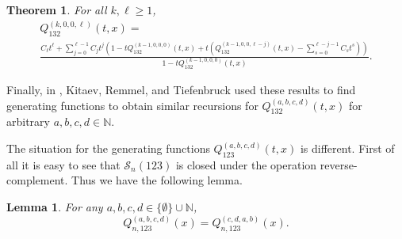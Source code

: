 \documentclass[
final,nomarks
]{dmtcs-episciences}
\newtheorem{theorem}{Theorem}
\newtheorem{lemma}{Lemma}
\newcommand{\Sn}[1]{\mathcal{S}_{#1}}
\begin{document}
\begin{theorem} \label{thm:k00l}
	For all \begin{math}k, \ell \geq 1\end{math}, 
	\begin{multline}\label{Qk00lgf-}
	Q_{132}^{(k,0,0,\ell)}(t,x) = \\
	\frac{C_\ell t^\ell + \sum_{j=0}^{\ell -1} C_j t^j (1 -tQ_{132}^{(k-1,0,0,0)}(t,x)
		+t(Q_{132}^{(k-1,0,0,\ell-j)}(t,x)-\sum_{s=0}^{\ell -j -1}C_s t^s))}{1-tQ_{132}^{(k-1,0,0,0)}(t,x)}.
	\end{multline}
\end{theorem}

Finally, in \cite{KRT3}, Kitaev, Remmel, and Tiefenbruck used these results to 
find generating functions to obtain similar recursions for \begin{math}Q_{132}^{(a,b,c,d)}(t,x)\end{math} 
for arbitrary \begin{math}a,b,c,d \in \mathbb{N}\end{math}. 


The situation for the generating functions \begin{math}Q_{123}^{(a,b,c,d)}(t,x)\end{math} is different. First of all it 
is easy to see that \begin{math}\Sn{n}(123)\end{math} is closed under the operation reverse-complement. Thus we 
have the following lemma. 

\begin{lemma}\label{sym2} 
	For any \begin{math}a,b,c,d \in \{\emptyset\} \cup \mathbb{N}\end{math}, 
	\begin{equation}
	Q_{n,123}^{(a,b,c,d)}(x) = Q_{n,123}^{(c,d,a,b)}(x). 
	\end{equation}
\end{lemma}
\end{document}
